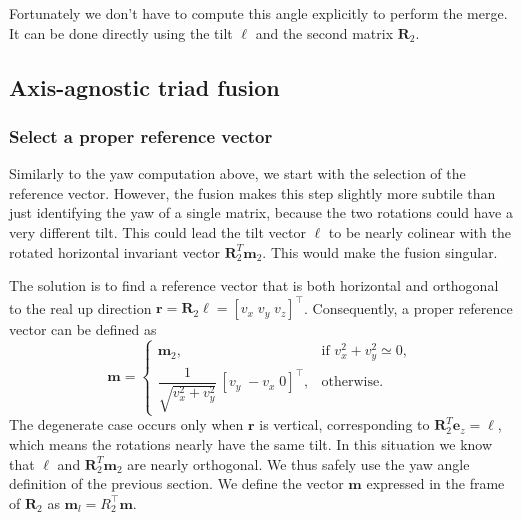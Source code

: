 \documentclass{IJCAS}
\begin{document}
 Fortunately we don't have to compute this angle explicitly to perform the merge. It can be done directly using the tilt $\boldsymbol{\ell}$ and the second matrix $\boldsymbol{R}_{2}$.

\subsection{Axis-agnostic triad fusion}
\label{sec:triad_fusion}

\subsubsection{Select a proper reference vector}
Similarly to the yaw computation above, we start with the selection of the reference vector. However, the fusion makes this step slightly more subtile than just identifying the yaw of a single matrix, because the two rotations could have a very different tilt. This could lead the tilt vector $\boldsymbol{\ell}$ to be nearly colinear with the rotated horizontal invariant vector $\boldsymbol{R}_{2}^T\boldsymbol{m}_2$. This would make the fusion singular. 

The solution is to find a reference vector that is both horizontal and orthogonal to the real up direction $\boldsymbol{r}=\boldsymbol{R}_{2}\boldsymbol{\ell}=[v_{x}\;v_{y}\;v_{z}]^{\top}$.
Consequently, a proper reference vector can be defined as
\begin{equation}
  \scriptstyle{
  \boldsymbol{m}
  =
  \begin{cases}
    \boldsymbol{m}_2, &
      \text{if } v_{x}^{2}+v_{y}^{2}\simeq0,\\[6pt]
    \dfrac{1}{\sqrt{v_{x}^{2}+v_{y}^{2}}}\,[v_{y}\;-v_{x}\;0]^{\top},
    & \text{otherwise.}
  \end{cases}
  }
\end{equation}
The degenerate case occurs only when $\boldsymbol{r}$ is vertical, corresponding to $\boldsymbol{R}_{2}^{T}\boldsymbol{e}_{z} = \boldsymbol{\ell}$, which means the rotations nearly have the same tilt. In this situation we know that $\boldsymbol{\ell}$ and $\boldsymbol{R}_{2}^T\boldsymbol{m}_2$ are nearly orthogonal. We thus safely use the yaw angle definition of the previous section. We define the vector $\boldsymbol{m}$ expressed in the frame of $\boldsymbol{R}_{2}$ as 
$\boldsymbol{m}_{l}=R_{2}^{\top}\boldsymbol{m}$.
\end{document}
